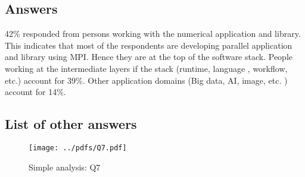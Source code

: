 
\subsection{Answers}



42\% responded from persons working with the
numerical application and library. This indicates that most of the
respondents 
are developing parallel application and library using MPI. Hence they
are at the top of 
the software stack. People working at the intermediate layers if the
stack (runtime, language , workflow, etc.) account for 39\%. Other 
application domains (Big data, AI, image, etc. ) account for 14\%. 


\subsection{List of other answers}
\begin{itemize}

\end{itemize}

\begin{figure}[htb]
\begin{center}
\texttt{[image: ../pdfs/Q7.pdf]}
\caption{Simple analysis: Q7}
\label{fig:Q7}
\end{center}
\end{figure}
